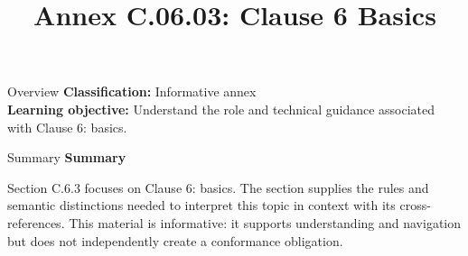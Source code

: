 \documentclass[10pt,letterpaper]{article}
\title{Annex C.06.03: Clause 6 Basics}
\author{}
\date{}
\begin{document}
\maketitle
\begin{CornellOverviewBox}{Overview}
\textbf{Classification:} Informative annex\\[2pt]
\textbf{Learning objective:} Understand the role and technical guidance associated with Clause 6: basics.
\end{CornellOverviewBox}\begin{CornellSummaryBox}{Summary}
{\sffamily\bfseries\color{Accent} Summary}\par\vspace{3pt}Section C.6.3 focuses on Clause 6: basics. The section supplies the rules and semantic distinctions needed to interpret this topic in context with its cross-references. This material is informative: it supports understanding and navigation but does not independently create a conformance obligation.
\end{CornellSummaryBox}
\end{document}
